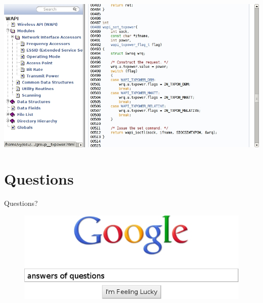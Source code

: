 \documentclass[turkish,12pt,red,compress,mathserif]{beamer}
\begin{document}
\begin{frame}
  \centering\includegraphics[width=\textwidth]{dox4.jpg}
\end{frame}


\section{Questions}

\begin{frame}{Questions?}
  \begin{figure}
    \centering\includegraphics{feeling-lucky.jpg}
  \end{figure}
\end{frame}

\end{document}
